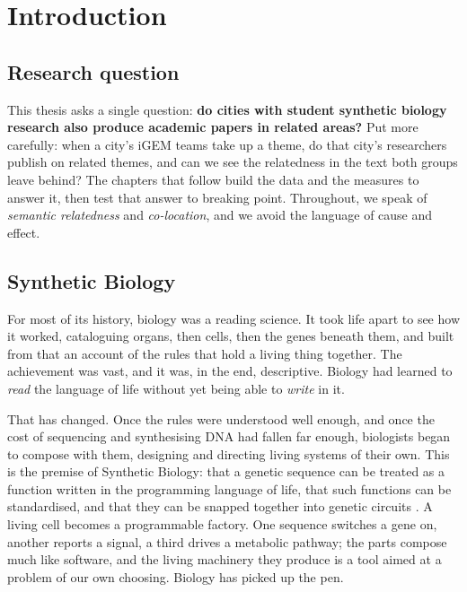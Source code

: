 \documentclass[12pt,a4paper]{article}
\begin{document}
	
	\newpage
	\tableofcontents
	\listoffigures
	\listoftables
	\newpage
	

	\section{Introduction}

	
	\subsection{Research question}
	
	This thesis asks a single question: \textbf{do cities with student synthetic
		biology research also produce academic papers in related areas?} Put more
	carefully: when a city's iGEM teams take up a theme, do that city's researchers
	publish on related themes, and can we see the relatedness in the text both groups
	leave behind? The chapters that follow build the data and the measures to answer
	it, then test that answer to breaking point. Throughout, we speak of
	\textit{semantic relatedness} and \textit{co-location}, and we avoid the language
	of cause and effect.
	
	\subsection{Synthetic Biology}
	
	For most of its history, biology was a reading science. It took life apart to see
	how it worked, cataloguing organs, then cells, then the genes beneath them, and
	built from that an account of the rules that hold a living thing together. The
	achievement was vast, and it was, in the end, descriptive. Biology had learned to
	\textit{read} the language of life without yet being able to \textit{write} in it.
	
	That has changed. Once the rules were understood well enough, and once the cost of
	sequencing and synthesising DNA had fallen far enough, biologists began to compose
	with them, designing and directing living systems of their own. This is the premise
	of Synthetic Biology: that a genetic sequence can be treated as a function written
	in the programming language of life, that such functions can be standardised, and
	that they can be snapped together into genetic circuits
	\citep{wayIntegratingBiologicalRedesign2014}. A living cell becomes a programmable
	factory. One sequence switches a gene on, another reports a signal, a third drives a
	metabolic pathway; the parts compose much like software, and the living machinery
	they produce is a tool aimed at a problem of our own choosing. Biology has picked up
	the pen.
	
\end{document}
